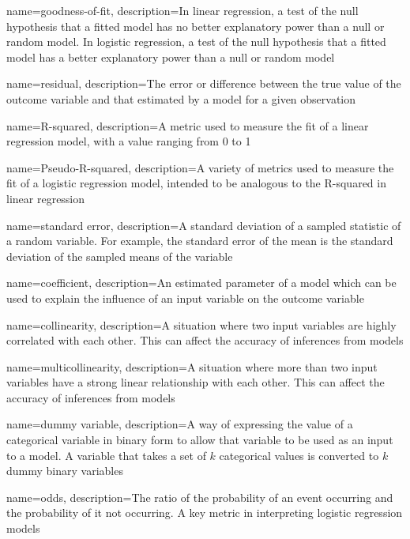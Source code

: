 {
    name={goodness-of-fit},
    description={In linear regression, a test of the null hypothesis that a fitted model has no better explanatory power than a null or random model.  In logistic regression, a test of the null hypothesis that a fitted model has a better explanatory power than a null or random model}
}

{
    name={residual},
    description={The error or difference between the true value of the outcome variable and that estimated by a model for a given observation}
}

{
    name={R-squared},
    description={A metric used to measure the fit of a linear regression model, with a value ranging from 0 to 1}
}

{
    name={Pseudo-R-squared},
    description={A variety of metrics used to measure the fit of a logistic regression model, intended to be analogous to the R-squared in linear regression}
}

{
    name={standard error},
    description={A standard deviation of a sampled statistic of a random variable.  For example, the standard error of the mean is the standard deviation of the sampled means of the variable}
}

{
    name={coefficient},
    description={An estimated parameter of a model which can be used to explain the influence of an input variable on the outcome variable}
}

{
    name={collinearity},
    description={A situation where two input variables are highly correlated with each other.  This can affect the accuracy of inferences from models}
}

{
    name={multicollinearity},
    description={A situation where more than two input variables have a strong linear relationship with each other.  This can affect the accuracy of inferences from models}
}

{
    name={dummy variable},
    description={A way of expressing the value of a categorical variable in binary form to allow that variable to be used as an input to a model.  A variable that takes a set of $k$ categorical values is converted to $k$ dummy binary variables}
}

{
    name={odds},
    description={The ratio of the probability of an event occurring and the probability of it not occurring.  A key metric in interpreting logistic regression models}
}

